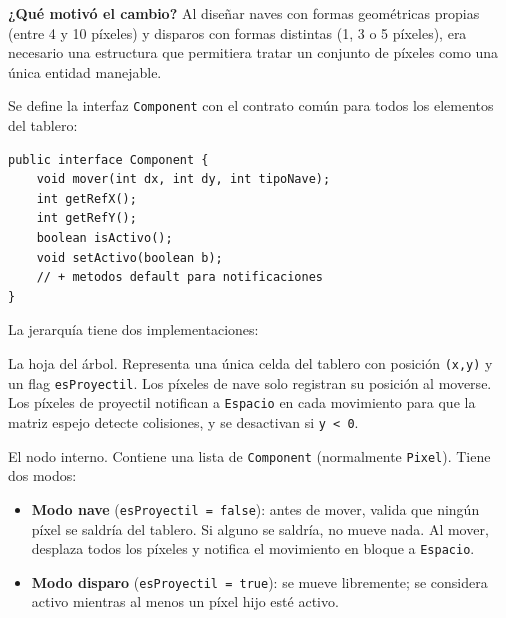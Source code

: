 \documentclass[12pt, a4paper]{article}
\begin{document}
\vspace{0.5em}
\textbf{¿Qu\'{e} motiv\'{o} el cambio?} Al dise\~{n}ar naves con formas geom\'{e}tricas propias (entre 4 y 10 p\'{i}xeles) y disparos con formas distintas (1, 3 o 5 p\'{i}xeles), era necesario una estructura que permitiera tratar un conjunto de p\'{i}xeles como una \'{u}nica entidad manejable.
 
\vspace{0.5em}
 
\begin{cajafinal}
Se define la interfaz \texttt{Component} con el contrato com\'{u}n para todos los elementos del tablero:
\begin{lstlisting}
public interface Component {
    void mover(int dx, int dy, int tipoNave);
    int getRefX();
    int getRefY();
    boolean isActivo();
    void setActivo(boolean b);
    // + metodos default para notificaciones
}
\end{lstlisting}
 
La jerarqu\'{i}a tiene dos implementaciones:
 
\begin{description}[leftmargin=2em, style=nextline]
    \item[\textbf{Pixel}] La hoja del \'{a}rbol. Representa una \'{u}nica celda del tablero con posici\'{o}n \texttt{(x,y)} y un flag \texttt{esProyectil}. Los p\'{i}xeles de nave solo registran su posici\'{o}n al moverse. Los p\'{i}xeles de proyectil notifican a \texttt{Espacio} en cada movimiento para que la matriz espejo detecte colisiones, y se desactivan si \texttt{y < 0}.
 
    \item[\textbf{Composite}] El nodo interno. Contiene una lista de \texttt{Component} (normalmente \texttt{Pixel}). Tiene dos modos:
    \begin{itemize}
        \item \textbf{Modo nave} (\texttt{esProyectil = false}): antes de mover, valida que ning\'{u}n p\'{i}xel se saldr\'{i}a del tablero. Si alguno se saldr\'{i}a, no mueve nada. Al mover, desplaza todos los p\'{i}xeles y notifica el movimiento en bloque a \texttt{Espacio}.
        \item \textbf{Modo disparo} (\texttt{esProyectil = true}): se mueve libremente; se considera activo mientras al menos un p\'{i}xel hijo est\'{e} activo.
    \end{itemize}
\end{description}
 

\end{cajafinal}
\end{document}
